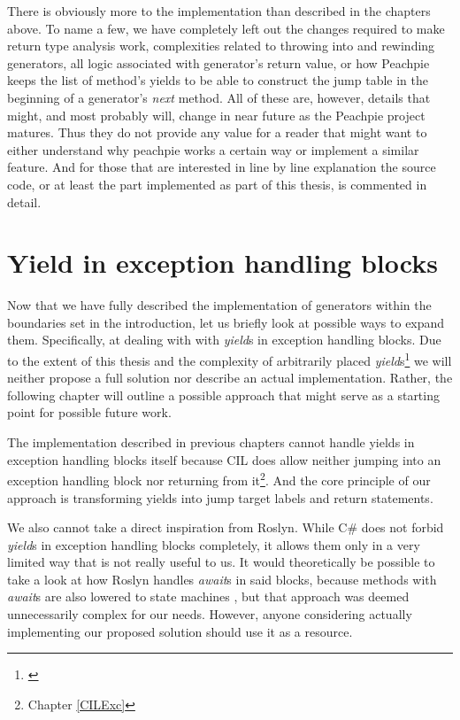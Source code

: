 There is obviously more to the implementation than described in the chapters above. To name a few, we have completely left out the changes required to make return type analysis work, complexities related to throwing into and rewinding generators, all logic associated with generator’s return value, or how Peachpie keeps the list of method’s yields to be able to construct the jump table in the beginning of a generator’s \emph{next} method. All of these are, however, details that might, and most probably will, change in near future as the Peachpie project matures. Thus they do not provide any value for a reader that might want to either understand why peachpie works a certain way or implement a similar feature. And for those that are interested in line by line explanation the source code, or at least the part implemented as part of this thesis, is commented in detail. 


\section{Yield in exception handling blocks}

Now that we have fully described the implementation of generators within the boundaries set in the introduction, let us briefly look at possible ways to expand them. Specifically, at dealing with with \emph{yield}s in exception handling blocks. Due to the extent of this thesis and the complexity of arbitrarily placed \emph{yield}s\footnote{\citep{CSharpYieldCatch, CSharpYieldFinally, CSharpYieldTry}} we will neither propose a full solution nor describe an actual implementation. Rather, the following chapter will outline a possible approach that might serve as a starting point for possible future work.

The implementation described in previous chapters cannot handle yields in exception handling blocks itself because CIL does allow neither jumping into an exception handling block nor returning from it\footnote{Chapter \ref{CILExc}}. And the core principle of our approach is transforming yields into jump target labels and return statements.

We also cannot take a direct inspiration from Roslyn. While C\# does not forbid \emph{yield}s in exception handling blocks completely, it allows them only in a very limited way that is not really useful to us. It would theoretically be possible to take a look at how Roslyn handles \emph{await}s in said blocks, because methods with \emph{await}s are also lowered to state machines \citep{CSAwait}, but that approach was deemed unnecessarily complex for our needs. However, anyone considering actually implementing our proposed solution should use it as a resource.

